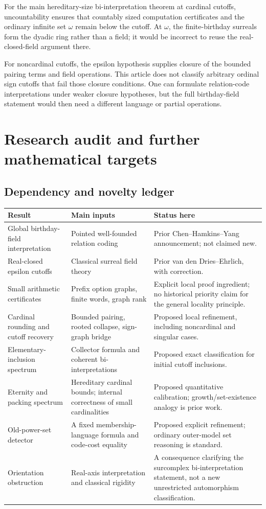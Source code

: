 \documentclass[11pt,letterpaper]{article}
\theoremstyle{definition}
\theoremstyle{remark}
\begin{document}
For the main hereditary-size bi-interpretation theorem at cardinal cutoffs,
uncountability ensures that countably sized computation certificates and the
ordinary infinite set $\omega$ remain below the cutoff. At $\omega$, the
finite-birthday surreals form the dyadic ring rather than a field; it would
be incorrect to reuse the real-closed-field argument there.

For noncardinal cutoffs, the epsilon hypothesis supplies closure of the
bounded pairing terms and field operations. This article does not classify
arbitrary ordinal sign cutoffs that fail those closure conditions. One can
formulate relation-code interpretations under weaker closure hypotheses,
but the full birthday-field statement would then need a different language
or partial operations.

\section{Research audit and further mathematical targets}
\label{sec:audit}

\subsection{Dependency and novelty ledger}

\begin{longtable}{@{}P{0.25\textwidth}P{0.37\textwidth}P{0.30\textwidth}@{}}
\toprule
Result & Main inputs & Status here\\
\midrule\endhead
Global birthday-field interpretation & Pointed well-founded relation coding & Prior Chen--Hamkins--Yang announcement; not claimed new.\\[0.5em]
Real-closed epsilon cutoffs & Classical surreal field theory & Prior van den Dries--Ehrlich, with correction.\\[0.5em]
Small arithmetic certificates & Prefix option graphs, finite words, graph rank & Explicit local proof ingredient; no historical priority claim for the general locality principle.\\[0.5em]
Cardinal rounding and cutoff recovery & Bounded pairing, rooted collapse, sign-graph bridge & Proposed local refinement, including noncardinal and singular cases.\\[0.5em]
Elementary-inclusion spectrum & Collector formula and coherent bi-interpretations & Proposed exact classification for initial cutoff inclusions.\\[0.5em]
Eternity and packing spectrum & Hereditary cardinal bounds; internal correctness of small cardinalities & Proposed quantitative calibration; growth/set-existence analogy is prior work.\\[0.5em]
Old-power-set detector & A fixed membership-language formula and code-cost equality & Proposed explicit refinement; ordinary outer-model set reasoning is standard.\\[0.5em]
Orientation obstruction & Real-axis interpretation and classical rigidity & A consequence clarifying the surcomplex bi-interpretation statement, not a new unrestricted automorphism classification.\\
\bottomrule
\end{longtable}
\end{document}

